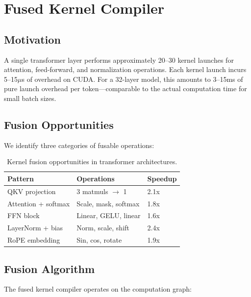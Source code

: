\section{Fused Kernel Compiler}

\label{sec:fusion}

\subsection{Motivation}

A single transformer layer performs approximately 20--30 kernel launches for attention, feed-forward, and normalization operations. Each kernel launch incurs 5--15$\mu$s of overhead on CUDA. For a 32-layer model, this amounts to 3--15ms of pure launch overhead per token---comparable to the actual computation time for small batch sizes.

\subsection{Fusion Opportunities}

We identify three categories of fusable operations:

\begin{table}[H]
\centering
\small
\begin{tabular}{lll}
\toprule
\textbf{Pattern} & \textbf{Operations} & \textbf{Speedup} \\
\midrule
QKV projection & 3 matmuls $\to$ 1 & 2.1x \\
Attention + softmax & Scale, mask, softmax & 1.8x \\
FFN block & Linear, GELU, linear & 1.6x \\
LayerNorm + bias & Norm, scale, shift & 2.4x \\
RoPE embedding & Sin, cos, rotate & 1.9x \\
\bottomrule
\end{tabular}
\caption{Kernel fusion opportunities in transformer architectures.}
\label{tab:fusion}
\end{table}

\subsection{Fusion Algorithm}

The fused kernel compiler operates on the computation graph:

